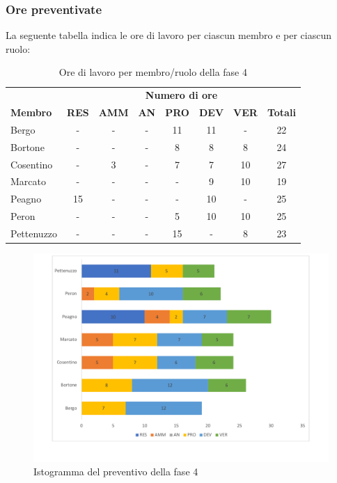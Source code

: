 	\subsubsection{Ore preventivate}
		La seguente tabella indica le ore di lavoro per ciascun membro e per ciascun ruolo:
		\begin{table}[H]
			\centering
			\begin{tabular}{| l | c c c c c c | c |}
				\rowcolor{LightBlue}
				& \multicolumn{7}{c}{\textbf{\color{white}Numero di ore}}	\\
		
				\rowcolor{LightBlue}
				\textbf{\color{white}Membro}
				& \textbf{\color{white}RES}
				& \textbf{\color{white}AMM}
				& \textbf{\color{white}AN}
				& \textbf{\color{white}PRO}
				& \textbf{\color{white}DEV}
				& \textbf{\color{white}VER}
				& \textbf{\color{white}Totali}\\
	
				Bergo      & - & - & - & 11 & 11 & - & 22\\
				Bortone    & - & - & - & 8 & 8 & 8 & 24\\
				Cosentino  & - & 3 & - & 7 & 7 & 10 & 27\\
				Marcato    & - & - & - & - & 9 & 10 & 19\\
				Peagno     & 15 & - & - & - & 10 & - & 25\\
				Peron      & - & - & - & 5 & 10 & 10 & 25\\
				Pettenuzzo & - & - & - & 15 & - & 8 & 23\\ \hline
			\end{tabular}
			\caption{Ore di lavoro per membro/ruolo della fase 4}
		\end{table}
		
	\begin{figure}[h]
	\centering
	\includegraphics[scale=0.45]{images/preventivoRA.pdf}
	\caption{Istogramma del preventivo della fase 4}
\end{figure}
		
